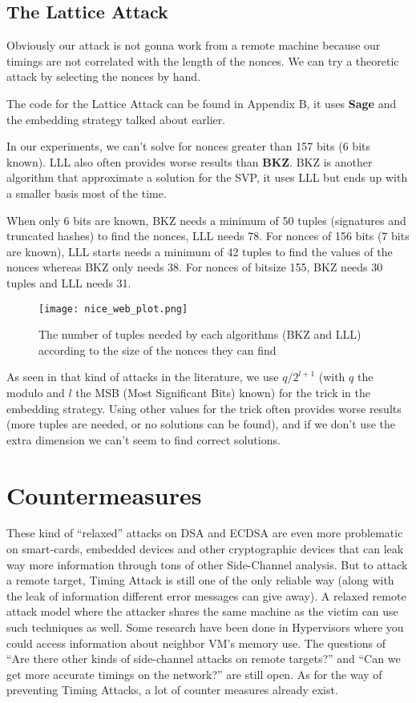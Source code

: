 \documentclass[a4paper,11pt]{article}
\begin{document}
\subsection{The Lattice Attack}

Obviously our attack is not gonna work from a remote machine because our timings are not correlated with the length of the nonces. We can try a theoretic attack by selecting the nonces by hand.

The code for the Lattice Attack can be found in Appendix B, it uses \textbf{Sage} and the embedding strategy talked about earlier.

In our experiments, we can't solve for nonces greater than 157 bits (6 bits known). LLL also often provides worse results than \textbf{BKZ}. BKZ is another algorithm that approximate a solution for the SVP, it uses LLL but ends up with a smaller basis most of the time.

When only 6 bits are known, BKZ needs a minimum of 50 tuples (signatures and truncated hashes) to find the nonces, LLL needs 78. For nonces of 156 bits (7 bits are known), LLL starts needs a minimum of 42 tuples to find the values of the nonces whereas BKZ only needs 38. For nonces of bitsize 155, BKZ needs 30 tuples and LLL needs 31.

\begin{figure}[H]
\texttt{[image: nice\_web\_plot.png]}
\caption{The number of tuples needed by each algorithms (BKZ and LLL) according to the size of the nonces they can find}
\end{figure}

As seen in that kind of attacks in the literature, we use $q / 2^{l + 1}$ (with $q$ the modulo and $l$ the MSB (Most Significant Bits) known) for the trick in the embedding strategy. Using other values for the trick often provides worse results (more tuples are needed, or no solutions can be found), and if we don't use the extra dimension we can't seem to find correct solutions.

\section{Countermeasures}

These kind of ``relaxed'' attacks on DSA and ECDSA are even more problematic on smart-cards, embedded devices and other cryptographic devices that can leak way more information through tons of other Side-Channel analysis. But to attack a remote target, Timing Attack is still one of the only reliable way (along with the leak of information different error messages can give away). A relaxed remote attack model where the attacker shares the same machine as the victim can use such techniques as well. Some research have been done in Hypervisors where you could access information about neighbor VM's memory use\cite{flushreload}\cite{flushreloadecdsa}\cite{flushreloadopenssl}. The questions of ``Are there other kinds of side-channel attacks on remote targets?'' and ``Can we get more accurate timings on the network?'' are still open. As for the way of preventing Timing Attacks, a lot of counter measures already exist.
\end{document}

